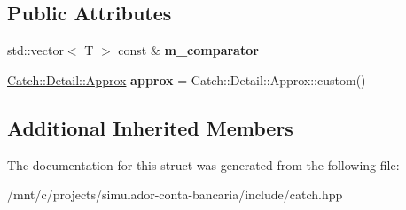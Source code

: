 \subsection*{Public Attributes}
\begin{DoxyCompactItemize}
\item 
\mbox{\label{structCatch_1_1Matchers_1_1Vector_1_1ApproxMatcher_a1394b5913d30bdd1147e1941fc41af56}} 
std\+::vector$<$ T $>$ const  \& {\bfseries m\+\_\+comparator}
\item 
\mbox{\label{structCatch_1_1Matchers_1_1Vector_1_1ApproxMatcher_a5515447af58adb5dc48a5d300b9ae162}} 
\hyperlink{classCatch_1_1Detail_1_1Approx}{Catch\+::\+Detail\+::\+Approx} {\bfseries approx} = Catch\+::\+Detail\+::\+Approx\+::custom()
\end{DoxyCompactItemize}
\subsection*{Additional Inherited Members}


The documentation for this struct was generated from the following file\+:\begin{DoxyCompactItemize}
\item 
/mnt/c/projects/simulador-\/conta-\/bancaria/include/catch.\+hpp\end{DoxyCompactItemize}
